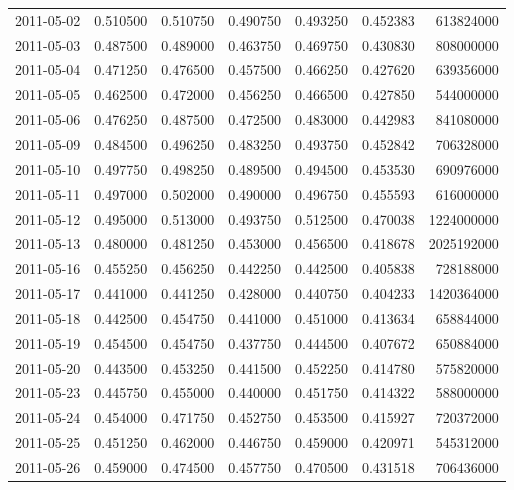 \begin{tabular}{lrrrrrr}
2011-05-02 &    0.510500 &    0.510750 &    0.490750 &    0.493250 &    0.452383 &   613824000 \\
2011-05-03 &    0.487500 &    0.489000 &    0.463750 &    0.469750 &    0.430830 &   808000000 \\
2011-05-04 &    0.471250 &    0.476500 &    0.457500 &    0.466250 &    0.427620 &   639356000 \\
2011-05-05 &    0.462500 &    0.472000 &    0.456250 &    0.466500 &    0.427850 &   544000000 \\
2011-05-06 &    0.476250 &    0.487500 &    0.472500 &    0.483000 &    0.442983 &   841080000 \\
2011-05-09 &    0.484500 &    0.496250 &    0.483250 &    0.493750 &    0.452842 &   706328000 \\
2011-05-10 &    0.497750 &    0.498250 &    0.489500 &    0.494500 &    0.453530 &   690976000 \\
2011-05-11 &    0.497000 &    0.502000 &    0.490000 &    0.496750 &    0.455593 &   616000000 \\
2011-05-12 &    0.495000 &    0.513000 &    0.493750 &    0.512500 &    0.470038 &  1224000000 \\
2011-05-13 &    0.480000 &    0.481250 &    0.453000 &    0.456500 &    0.418678 &  2025192000 \\
2011-05-16 &    0.455250 &    0.456250 &    0.442250 &    0.442500 &    0.405838 &   728188000 \\
2011-05-17 &    0.441000 &    0.441250 &    0.428000 &    0.440750 &    0.404233 &  1420364000 \\
2011-05-18 &    0.442500 &    0.454750 &    0.441000 &    0.451000 &    0.413634 &   658844000 \\
2011-05-19 &    0.454500 &    0.454750 &    0.437750 &    0.444500 &    0.407672 &   650884000 \\
2011-05-20 &    0.443500 &    0.453250 &    0.441500 &    0.452250 &    0.414780 &   575820000 \\
2011-05-23 &    0.445750 &    0.455000 &    0.440000 &    0.451750 &    0.414322 &   588000000 \\
2011-05-24 &    0.454000 &    0.471750 &    0.452750 &    0.453500 &    0.415927 &   720372000 \\
2011-05-25 &    0.451250 &    0.462000 &    0.446750 &    0.459000 &    0.420971 &   545312000 \\
2011-05-26 &    0.459000 &    0.474500 &    0.457750 &    0.470500 &    0.431518 &   706436000 \\

\end{tabular}
